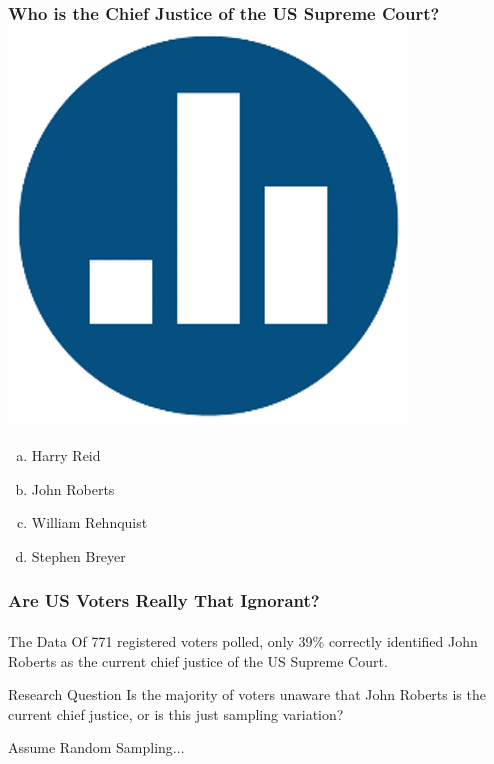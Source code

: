 \begin{frame}
\frametitle{Who is the Chief Justice of the US Supreme Court?\hfill \includegraphics[scale = 0.05]{./images/clicker}}
	\begin{enumerate}[(a)]
	\item Harry Reid
	\item John Roberts
	\item William Rehnquist
	\item Stephen Breyer
\end{enumerate}


\end{frame}
\begin{frame}
\frametitle{Are US Voters Really That Ignorant?}
\framesubtitle{}

\begin{block}{The Data}
Of 771 registered voters polled, only 39\% correctly identified John Roberts as the current chief justice of the US Supreme Court.
\end{block}

\begin{block}{Research Question}
Is the majority of voters unaware that John Roberts is the current chief justice, or is this just sampling variation?
\end{block}

\alert{Assume Random Sampling...}

\end{frame}
